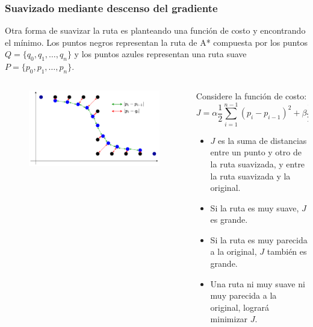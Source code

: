 \begin{frame}\frametitle{Suavizado mediante descenso del gradiente}
  Otra forma de suavizar la ruta es planteando una función de costo y encontrando el mínimo. Los puntos negros representan la ruta de A* compuesta por los puntos $Q=\{q_0, q_1, \dots, q_n\}$ y los puntos azules representan una ruta suave $P=\{p_0, p_1,\dots, p_n\}$.
  \begin{columns}
    \begin{column}{0.5\textwidth}
      \begin{figure}
        \centering
        \includegraphics[width=\textwidth]{Figures/PathSmoothing.pdf}
      \end{figure}
    \end{column}
    \begin{column}{0.5\textwidth}
      Considere la función de costo:
      \[J = \alpha\frac{1}{2}\sum_{i=1}^{n-1}\left(p_i - p_{i-1}\right)^2 + \beta\frac{1}{2}\sum_{i=1}^{n-1}(p_i - q_i)^2\]
      \begin{itemize}
      \item $J$ es la suma de distancias entre un punto y otro de la ruta suavizada, y entre la ruta suavizada y la original.
      \item Si la ruta es muy suave, $J$ es grande.
      \item Si la ruta es muy parecida a la original, $J$ también es grande.
      \item Una ruta ni muy suave ni muy parecida a la original, logrará minimizar $J$.
      \end{itemize}
    \end{column}
  \end{columns}
\end{frame}

